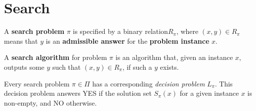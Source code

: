 \chapter{Search}

\begin{defn}\label{search_problem}
    A \textbf{search problem} \(\pi\) is specified by a binary relation\( R_\pi \), where \((x,y) \in R_\pi\) means that \( y \) is an \textbf{admissible answer} for the \textbf{problem instance} \( x \).
\end{defn}

\begin{defn}\label{search_algorithm}
    A \textbf{search algorithm} for problem \(\pi\) is an algorithm that, given an instance \( x \), outputs some \( y \) such that \((x,y) \in R_\pi\), if such a \( y \) exists.
\end{defn}

\begin{remark}
    Every search problem \(\pi \in \Pi\) has a corresponding \emph{decision problem} \(L_\pi\). This decision problem answers YES if the solution set \(S_{\pi}(x)\) for a given instance \(x\) is non-empty, and NO otherwise.
\end{remark}

